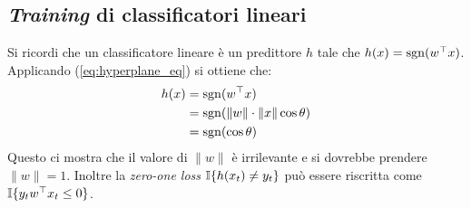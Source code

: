 \subsection{\textit{Training} di classificatori lineari}
Si ricordi che un classificatore lineare è un predittore $h$ tale che
$h(x)=\operatorname*{sgn}(w^\top x)$. Applicando (\ref{eq:hyperplane_eq}) si ottiene che:
$$ \begin{aligned}
   h(x)&=\operatorname*{sgn}(w^\top x)\\
   &=\operatorname*{sgn}(\|w\|\cdot\|x\|\cos\theta)\\
   &=\operatorname*{sgn}(\cos\theta)\\
\end{aligned} $$
Questo ci mostra che il valore di $\|w\|$ è irrilevante e si dovrebbe
prendere $\|w\|=1$. Inoltre la \textit{zero-one loss} $\mathbb{I}\{h(x_t)\neq y_t\}$
può essere riscritta come $\mathbb{I}\{y_tw^\top x_t\leq 0\}$.